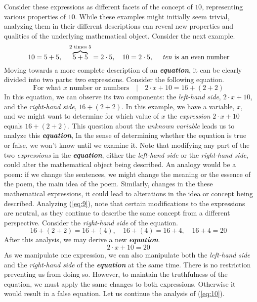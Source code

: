 Consider these expressions as different facets of the concept of $10$, representing various properties of $10$. While these examples might initially seem trivial, analyzing them in their different descriptions can reveal new properties and qualities of the underlying mathematical object. Consider the next example.
\begin{equation} \label{eq:8}
  10 = 5 + 5,\quad \overset{2 \text{ times } 5}{\overbrace{5 + 5}} = 2 \cdot 5,\quad 10 = 2 \cdot 5,\quad
  \text{ \textit{ten} is an even number}
\end{equation}
Moving towards a more complete description of an \textbf{\textit{equation}}, it can be clearly divided into two parts: two expressions. Consider the following equation.
\begin{equation} \label{eq:9}
  \text{For what $x$ number or numbers}\quad |\quad 2 \cdot x + 10 = 16 + (2 + 2)
\end{equation}
In this equation, we can observe its two components: the \textit{left-hand side}, $2 \cdot x + 10$, and the \textit{right-hand side}, $16 + (2 + 2)$. In this example, we have a variable, $x$, and we might want to determine for which value of $x$ the \textit{expression} $2 \cdot x + 10$ equals $16 + (2 + 2)$. This question about the \textit{unknown variable} leads us to analyze this \textbf{\textit{equation}}, In the sense of determining whether the equation is true or false, we won't know until we examine it. Note that modifying any part of the two \textit{expressions} in the \textbf{\textit{equation}}, either the \textit{left-hand side} or the \textit{right-hand side}, could alter the mathematical object being described. An analogy would be a poem: if we change the sentences, we might change the meaning or the essence of the poem, the main idea of the poem. Similarly, changes in the these mathematical expressions, it could lead to alterations in the idea or concept being described.
Analyzing (\ref{eq:9}), note that certain modifications to the expressions are neutral, as they continue to describe the same concept from a different perspective. Consider the \textit{right-hand side} of the equation.
\[
  16 + (2 + 2) = 16 + (4),\quad 16 + (4) = 16 + 4,\quad 16 + 4 = 20
\]
After this analysis, we may derive a new \textbf{\textit{equation}}.
\begin{equation} \label{eq:10}
  2 \cdot x + 10 = 20
\end{equation}
As we manipulate one expression, we can also manipulate both the \textit{left-hand side} and the \textit{right-hand side} of the \textbf{\textit{equation}} at the same time. There is no restriction preventing us from doing so. However, to maintain the truthfulness of the equation, we must apply the same changes to both expressions. Otherwise it would result in a false equation. Let us continue the analysis of (\ref{eq:10}).
